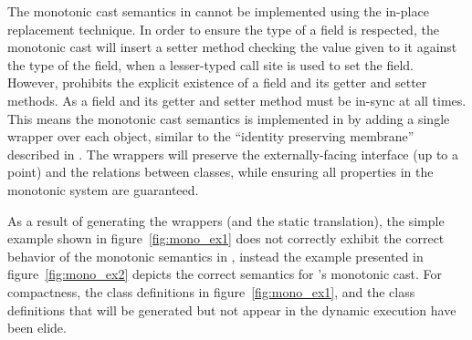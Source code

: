 \documentclass[a4paper,USenglish]{tex/lipics-v2016}
\begin{document}
The monotonic cast semantics in \kafka cannot be implemented using the  
in-place replacement technique\cite{Siek2015}. In order to ensure the
type of a field is respected, the monotonic cast will insert a setter method
checking the value given to it against the type of the field, when
a lesser-typed call site is used to set the field. However, \kafka prohibits
the explicit existence of a field and its getter and setter methods.
As a field and its getter and setter method must be in-sync at all times.
This means the monotonic cast semantics is implemented in \kafka by adding a 
single wrapper over each object, similar to the ``identity preserving membrane''
described in \cite{keil_et_al:DARTS:2015:5511}. The wrappers will preserve the
externally-facing interface (up to a point) and the relations between classes,
while ensuring all properties in the monotonic system are guaranteed.

As a result of generating the wrappers (and the static translation), the simple example 
shown in figure~\ref{fig:mono_ex1} does not correctly exhibit the correct behavior of the 
monotonic semantics in \kafka, instead the example presented in figure~\ref{fig:mono_ex2}
depicts the correct semantics for \kafka's monotonic cast.
For compactness, the class definitions in figure~\ref{fig:mono_ex1}, and the class definitions that will be generated but
not appear in the dynamic execution have been elide.
\end{document}
